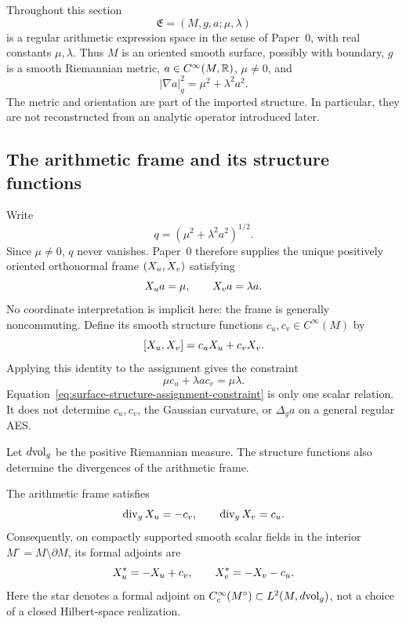 Throughout this section
\[
 \mathfrak E=(M,g,a;\mu,\lambda)
\]
is a regular arithmetic expression space in the sense of Paper~0, with real
constants $\mu,\lambda$.  Thus $M$
is an oriented smooth surface, possibly with boundary, $g$ is a smooth
Riemannian metric, $a\in C^\infty(M,\mathbb{R})$, $\mu\ne0$, and
\begin{equation}\label{eq:paper2-regular-eikonal}
 |\nabla a|_g^2=\mu^2+\lambda^2a^2.
\end{equation}
The metric and orientation are part of the imported structure.  In particular,
they are not reconstructed from an analytic operator introduced later.

\subsection{The arithmetic frame and its structure functions}

Write
\[
 q=(\mu^2+\lambda^2a^2)^{1/2}.
\]
Since $\mu\ne0$, $q$ never vanishes.  Paper~0 therefore supplies the unique
positively oriented orthonormal frame $(X_u,X_v)$ satisfying
\begin{equation}\label{eq:paper2-assignment-frame-rules}
 X_u a=\mu,
 \qquad
 X_v a=\lambda a.
\end{equation}
No coordinate interpretation is implicit here: the frame is generally
noncommuting.  Define its smooth structure functions
$c_u,c_v\in C^\infty(M)$
by
\begin{equation}\label{eq:surface-frame-bracket}
 [X_u,X_v]=c_uX_u+c_vX_v.
\end{equation}
Applying this identity to the assignment gives the constraint
\begin{equation}\label{eq:surface-structure-assignment-constraint}
 \mu c_u+\lambda a c_v=\mu\lambda.
\end{equation}
Equation~\eqref{eq:surface-structure-assignment-constraint} is only one scalar
relation.  It does not determine $c_u,c_v$, the Gaussian curvature, or
$\Delta_ga$ on a general regular AES.

Let $d\mathrm{vol}_g$ be the positive Riemannian measure.  The structure functions
also determine the divergences of the arithmetic frame.

\begin{proposition}
\label{prop:surface-frame-divergence}
The arithmetic frame satisfies
\begin{equation}\label{eq:surface-frame-divergences}
 \operatorname{div}_gX_u=-c_v,
 \qquad
 \operatorname{div}_gX_v=c_u.
\end{equation}
Consequently, on compactly supported smooth scalar fields in the interior
$M^\circ=M\setminus\partial M$, its formal adjoints are
\begin{equation}\label{eq:surface-frame-formal-adjoints}
 X_u^*=-X_u+c_v,
 \qquad
 X_v^*=-X_v-c_u.
\end{equation}
Here the star denotes a formal adjoint on
$C_c^\infty(M^\circ)\subset L^2(M,d\mathrm{vol}_g)$, not a choice of a closed
Hilbert-space realization.
\end{proposition}

